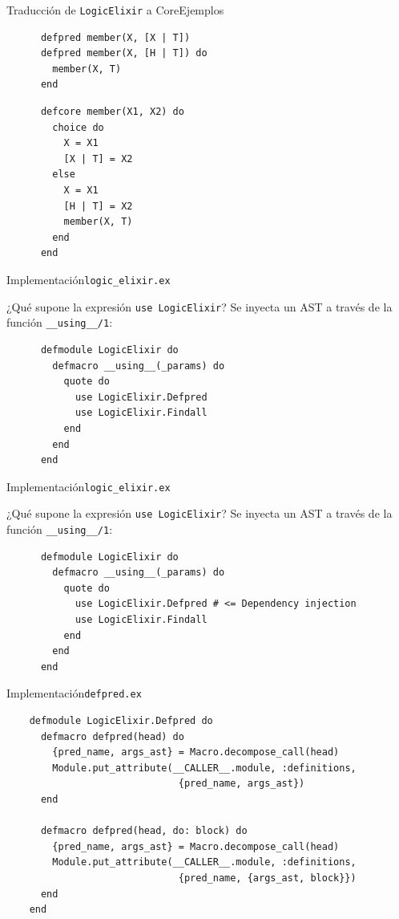 \documentclass[14pt,aspectratio=169]{beamer}
\begin{document}
\begin{frame}[fragile]{Traducción de \texttt{LogicElixir} a Core}{Ejemplos}
  \begin{multicols}{2}
    \footnotesize \begin{verbatim}
      defpred member(X, [X | T])
      defpred member(X, [H | T]) do
        member(X, T)
      end
    \end{verbatim}
    \columnbreak
    \footnotesize \begin{verbatim}
      defcore member(X1, X2) do
        choice do
          X = X1
          [X | T] = X2
        else
          X = X1
          [H | T] = X2
          member(X, T)
        end
      end
    \end{verbatim}
  \end{multicols}
\end{frame}

\begin{frame}[fragile]{Implementación}{\texttt{logic\_elixir.ex}}
  \begin{block}{¿Qué supone la expresión \texttt{use LogicElixir}?}
    Se inyecta un AST a través de la función \texttt{\_\_using\_\_/1}:
    \small\begin{verbatim}
      defmodule LogicElixir do
        defmacro __using__(_params) do
          quote do
            use LogicElixir.Defpred
            use LogicElixir.Findall
          end
        end
      end
    \end{verbatim}
  \end{block}
\end{frame}

\begin{frame}[fragile]{Implementación}{\texttt{logic\_elixir.ex}}
  \begin{block}{¿Qué supone la expresión \texttt{use LogicElixir}?}
    Se inyecta un AST a través de la función \texttt{\_\_using\_\_/1}:
    \small\begin{verbatim}
      defmodule LogicElixir do
        defmacro __using__(_params) do
          quote do
            use LogicElixir.Defpred # <= Dependency injection
            use LogicElixir.Findall
          end
        end
      end
    \end{verbatim}
  \end{block}
\end{frame}

\begin{frame}[fragile]{Implementación}{\texttt{defpred.ex}}
  \footnotesize \begin{verbatim}
    defmodule LogicElixir.Defpred do
      defmacro defpred(head) do
        {pred_name, args_ast} = Macro.decompose_call(head)
        Module.put_attribute(__CALLER__.module, :definitions,
                              {pred_name, args_ast})
      end

      defmacro defpred(head, do: block) do
        {pred_name, args_ast} = Macro.decompose_call(head)
        Module.put_attribute(__CALLER__.module, :definitions,
                              {pred_name, {args_ast, block}})
      end
    end
  \end{verbatim}
\end{frame}
\end{document}

